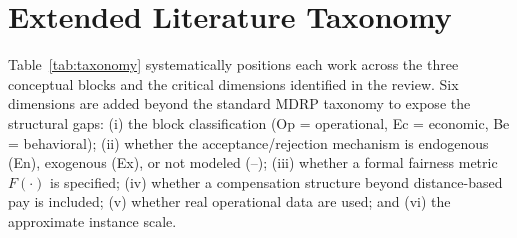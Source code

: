 \documentclass[12pt,a4paper]{report}
\begin{document}
\section{Extended Literature Taxonomy}
\label{sec:taxonomy}

Table~\ref{tab:taxonomy} systematically positions each work across the three conceptual blocks and the critical dimensions identified in the review. Six dimensions are added beyond the standard MDRP taxonomy to expose the structural gaps: (i) the block classification (Op = operational, Ec = economic, Be = behavioral); (ii) whether the acceptance/rejection mechanism is endogenous (En), exogenous (Ex), or not modeled (--); (iii) whether a formal fairness metric $F(\cdot)$ is specified; (iv) whether a compensation structure beyond distance-based
pay is included; (v) whether real operational data are used; and (vi) the approximate
instance scale.
\end{document}
